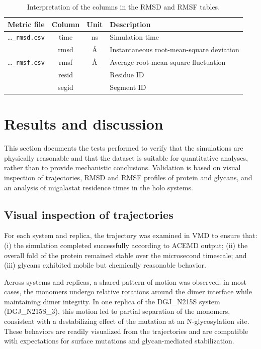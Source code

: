 \documentclass{article}
\begin{document}
\begin{table}[h]
    \centering
    \begin{tabular}{cccl}
    \toprule
        Metric file        &   Column & Unit & Description \\
    \midrule
        \dots\texttt{\_rmsd.csv}    &    time  &  ns  & Simulation time \\
                    & rmsd     &  \AA & Instantaneous root-mean-square deviation \\
    \midrule
        \dots\texttt{\_rmsf.csv}   & rmsf & \AA & Average root-mean-square fluctuation \\
                   & resid &    & Residue ID \\
                   & segid &    & Segment ID \\
    \bottomrule
    \end{tabular}
    \caption{Interpretation of the columns in the RMSD and RMSF tables.}
    \label{tab:RMSD_F}
\end{table}

\section{Results and discussion}

This section documents the tests performed to verify that the simulations are physically reasonable and that the dataset is suitable for quantitative analyses, rather than to provide mechanistic conclusions.
Validation is based on visual inspection of trajectories, RMSD and RMSF profiles of protein and glycans, and an analysis of migalastat residence times in the holo systems.

\subsection{Visual inspection of trajectories}

For each system and replica, the trajectory was examined in VMD to ensure that:
(i) the simulation completed successfully according to ACEMD output;
(ii) the overall fold of the protein remained stable over the microsecond timescale; and
(iii) glycans exhibited mobile but chemically reasonable behavior.

Across systems and replicas, a shared pattern of motion was observed: in most cases, the monomers undergo relative rotations around the dimer interface while maintaining dimer integrity.
In one replica of the DGJ\_N215S system (DGJ\_N215S\_3), this motion led to partial separation of the monomers, consistent with a destabilizing effect of the mutation at an N-glycosylation site.
These behaviors are readily visualized from the trajectories and are compatible with expectations for surface mutations and glycan-mediated stabilization.
\end{document}
